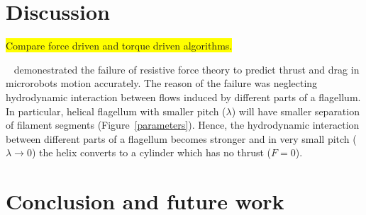 \documentclass[12pt,a4paper,titlepage]{report}
\newcommand{\hilight}[1]{\colorbox{yellow}{#1}}
\begin{document}
\chapter{Discussion}\label{discussion}

 \hilight{Compare force driven and torque driven algorithms.}


\citeauthor{rodenborn2013propulsion}~\citep{rodenborn2013propulsion} demonestrated the failure of resistive force
 theory to predict thrust and drag in microrobots motion accurately. The reason of the failure was neglecting hydrodynamic
interaction between flows induced by different parts of a flagellum. In particular, helical flagellum with
 smaller pitch ($\lambda$) will have smaller separation of filament segments (Figure~\ref{parameters}). Hence,
 the hydrodynamic interaction between different parts of a flagellum becomes stronger and in very small
pitch ($\lambda \to 0$) the helix converts to a cylinder which has no thrust ($F= 0$).

\chapter{Conclusion and future work}



\nocite{lauga2006swimming}



\renewcommand{\bibname}{References}

 
\end{document}
